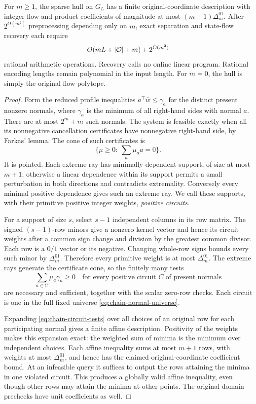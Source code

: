 \begin{theorem}\label{thm:fixed-chain}
For $m\ge1$, the sparse hull on $G_L$ has a finite
original-coordinate description with integer flow and product
coefficients of magnitude at most $(m+1)\Delta^{01}_m$.
After $2^{O(m^2)}$ preprocessing depending only on $m$, exact
separation and state-flow recovery each require
\[
 O(mL+|\mathcal O|+m)+2^{O(m^2)}
\]
rational arithmetic operations. Recovery calls no online linear
program. Rational encoding lengths remain polynomial in the input
length. For $m=0$, the hull is simply the original flow polytope.
\end{theorem}
\begin{proof}
Form the reduced profile inequalities
$a^\top\widehat w\le\gamma_a$ for the distinct present nonzero
normals, where $\gamma_a$ is the minimum of all right-hand sides
with normal $a$. There are at most $2^m+m$ such normals.
The system is feasible exactly when all its nonnegative cancellation
certificates have nonnegative right-hand side, by Farkas' lemma.
The cone of such certificates is
\[
 \{\mu\ge0:\ \sum_a\mu_a a=0\}.
\]
It is pointed. Each extreme ray has minimally dependent support,
of size at most $m+1$; otherwise a linear dependence within its
support permits a small perturbation in both directions and contradicts
extremality. Conversely every minimal positive dependence gives such
an extreme ray. We call these supports, with their primitive positive
integer weights, \emph{positive circuits}.

For a support of size $s$, select $s-1$ independent columns in
its row matrix. The signed $(s-1)$-row minors give a nonzero kernel
vector and hence its circuit weights after a common sign change and
division by the greatest common divisor. Each row is a $0/1$ vector
or its negative. Changing whole-row signs bounds every such minor
by $\Delta^{01}_m$. Therefore every primitive weight is at most
$\Delta^{01}_m$. The extreme rays generate the certificate cone, so
the finitely many tests
\begin{equation}\label{eq:chain-circuit-tests}
 \sum_{a\in C}\mu_a\gamma_a\ge0
 \quad\text{for every positive circuit $C$ of present normals}
\end{equation}
are necessary and sufficient, together with the scalar zero-row
checks. Each circuit is one in the full fixed universe
\eqref{eq:chain-normal-universe}.

Expanding \eqref{eq:chain-circuit-tests} over all choices of an
original row for each participating normal gives a finite affine
description. Positivity of the weights makes this expansion exact:
the weighted sum of minima is the minimum over independent choices.
Each affine inequality sums at most $m+1$ rows, with weights at
most $\Delta^{01}_m$, and hence has the claimed original-coordinate
coefficient bound. At an infeasible query it suffices to output the
rows attaining the minima in one violated circuit. This produces
a globally valid affine inequality, even though other rows may
attain the minima at other points. The original-domain prechecks
have unit coefficients as well.


\end{proof}
